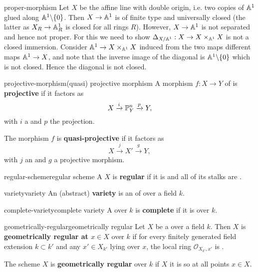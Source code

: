 \begin{example}{proper-morphism}
    Let $X$ be the affine line with double origin, i.e. two copies of $\AA^1$ glued along $\AA^1 \backslash \{ 0 \}$. Then $X \to \AA^1$ is of finite type and universally closed (the latter as $X_R \to \AA^1_R$ is closed for all rings $R$). However, $X \to \AA^1$ is not separated and hence not proper. For this we need to show $\Delta_{X / \AA^1} : X \to X \times_{\AA^1} X$ is not a closed immersion. Consider $\AA^1 \to X \times_{\AA^1} X$ induced from the two maps different maps $\AA^1 \to X$, and note that the inverse image of the diagonal is $\AA^1 \backslash \{ 0 \}$ which is not closed. Hence the diagonal is not closed.
\end{example}

\begin{topic}{projective-morphism}{(quasi) projective morphism}
    A morphism $f : X \to Y$ of  is \textbf{projective} if it factors as
    \[ X \xrightarrow{i} \PP^n_Y \xrightarrow{p} Y , \]
    with $i$ a  and $p$ the projection.
    
    The morphism $f$ is \textbf{quasi-projective} if it factors as
    \[ X \xrightarrow{j} X' \xrightarrow{g} Y , \]
    with $j$ an  and $g$ a projective morphism.
\end{topic}

\begin{topic}{regular-scheme}{regular scheme}
    A  $X$ is \textbf{regular} if it is  and all of its stalks are .
\end{topic}

\begin{topic}{variety}{variety}
    An (abstract) \textbf{variety} is an    of  over a field $k$.
\end{topic}

\begin{topic}{complete-variety}{complete variety}
    A  over $k$ is \textbf{complete} if it is  over $k$.
\end{topic}

\begin{topic}{geometrically-regular}{geometrically regular}
    Let $X$ be a   over a field $k$. Then $X$ is \textbf{geometrically regular at $x \in X$} over $k$ if for every finitely generated field extension $k \subset k'$ and any $x' \in X_{k'}$ lying over $x$, the local ring $\mathcal{O}_{X_{k'}, x'}$ is .
    
    The scheme $X$ is \textbf{geometrically regular} over $k$ if $X$ it is so at all points $x \in X$.
\end{topic}

